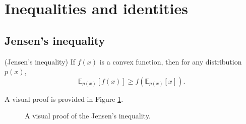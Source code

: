 \section{Inequalities and identities}
\label{sec:appendix_identities}

\subsection{Jensen's inequality}
\begin{prop}
(Jensen's inequality) 
If $f(x)$ is a convex function, then for any distribution $p(x)$,
$$ \mathbb{E}_{p(x)}[f(x)] \geq f(\mathbb{E}_{p(x)}[x]) .$$
\end{prop}
%
A visual proof is provided in Figure \ref{fig:appendix_jensen}.

\begin{figure}[ht]
 \centering
 \hfill
 \caption{A visual proof of the Jensen's inequality. }
 \label{fig:appendix_jensen}
\end{figure}


